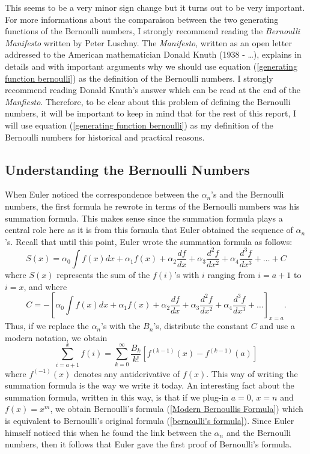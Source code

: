 This seems to be a very minor sign change but it turns out to be very important. For more informations about the comparaison between the two generating functions of the Bernoulli numbers, I strongly recommend reading the \textit{Bernoulli Manifesto} written by Peter Luschny. The \textit{Manifesto}, written as an open letter addressed to the American mathematician Donald Knuth (1938 - \dots), explains in details and with important arguments why we should use equation (\ref{generating function bernoulli}) as the definition of the Bernoulli numbers. I strongly recommend reading Donald Knuth's answer which can be read at the end of the \textit{Manfiesto}. Therefore, to be clear about this problem of defining the Bernoulli numbers, it will be important to keep in mind that for the rest of this report, I will use equation (\ref{generating function bernoulli}) as my definition of the Bernoulli numbers for historical and practical reasons.

\subsection*{Understanding the Bernoulli Numbers}

When Euler noticed the correspondence between the $\alpha_n$'s and the Bernoulli numbers, the first formula he rewrote in terms of the Bernoulli numbers was his summation formula. This makes sense since the summation formula plays a central role here as it is from this formula that Euler obtained the sequence of $\alpha_n$'s. Recall that until this point, Euler wrote the summation formula as follows:
$$S(x) = \alpha_0\int f(x)dx + \alpha_1f(x) + \alpha_2\frac{df}{dx} + \alpha_3\frac{d^2f}{dx^2} + \alpha_4\frac{d^3f}{dx^3} + \dots + C$$
where $S(x)$ represents the sum of the $f(i)$'s with $i$ ranging from $i = a+1$ to $i = x$, and where
$$C = -\left[\alpha_0\int f(x)dx + \alpha_1f(x) + \alpha_2\frac{df}{dx} + \alpha_3\frac{d^2f}{dx^2} + \alpha_4\frac{d^3f}{dx^3} + \dots\right]_{x = a}.$$
Thus, if we replace the $\alpha_n$'s with the $B_n$'s, distribute the constant $C$ and use a modern notation, we obtain
\begin{equation}
    \boxed{\sum_{i=a+1}^{x}f(i) = \sum_{k=0}^{\infty}\frac{B_k}{k!}[f^{(k-1)}(x) - f^{(k-1)}(a)]}
\end{equation}
where $f^{(-1)}(x)$ denotes any antiderivative of $f(x)$. This way of writing the summation formula is the way we write it today. An interesting fact about the summation formula, written in this way, is that if we plug-in $a=0$, $x = n$ and $f(x) = x^m$, we obtain Bernoulli's formula (\ref{Modern Bernoullis Formula}) which is equivalent to Bernoulli's original formula (\ref{bernoulli's formula}). Since Euler himself noticed this when he found the link between the $\alpha_n$ and the Bernoulli numbers, then it follows that Euler gave the first proof of Bernoulli's formula.

